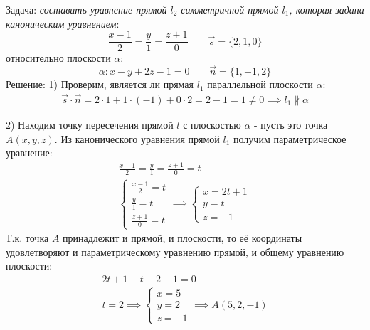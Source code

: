 \begin{eg}
  Задача: \textit{составить уравнение прямой $l_2$ симметричной прямой $l_1$, которая задана каноническим уравнением}: \[
  \frac{x - 1}{2} = \frac{y}{1} = \frac{z + 1}{0} \qquad \vec{s} = \{2, 1, 0\} 
  \] 
  относительно плоскости $\alpha$: \[
    \alpha: x - y + 2z - 1 = 0 \qquad \vec{n} = \{1, -1, 2\} 
  \] 
  Решение:
  1) Проверим, является ли прямая $l_1$ параллельной плоскости $\alpha$:
  \begin{gather*}
    \vec{s} \cdot \vec{n} = 2 \cdot 1 + 1 \cdot (-1) + 0 \cdot 2 = 2 - 1 = 1 \neq 0 \implies l_1 \not \parallel \alpha
  \end{gather*}

  2) Находим точку пересечения прямой $l$ с плоскостью $\alpha$ - пусть это точка $A(x, y, z)$.
  Из канонического уравнения прямой $l_1$ получим параметрическое уравнение:
  \begin{gather*}
    \frac{x - 1}{2} = \frac{y}{1} = \frac{z + 1}{0} = t \\
    \begin{cases}
      \frac{x - 1}{2} = t \\
      \frac{y}{1} = t \\
      \frac{z + 1}{0} = t
    \end{cases} \implies
    \begin{cases}
      x = 2t + 1 \\
      y = t \\
      z = -1
    \end{cases}
  \end{gather*}
  Т.к. точка $A$ принадлежит и прямой, и плоскости, то её координаты удовлетворяют и параметрическому уравнению прямой, и общему уравнению плоскости:
  \begin{gather*}
    2t + 1 - t - 2 - 1 = 0 \\
    t = 2 \implies \begin{cases}
      x = 5 \\
      y = 2 \\
      z = -1
    \end{cases} \implies A(5, 2, -1)
  \end{gather*}


\end{eg}
